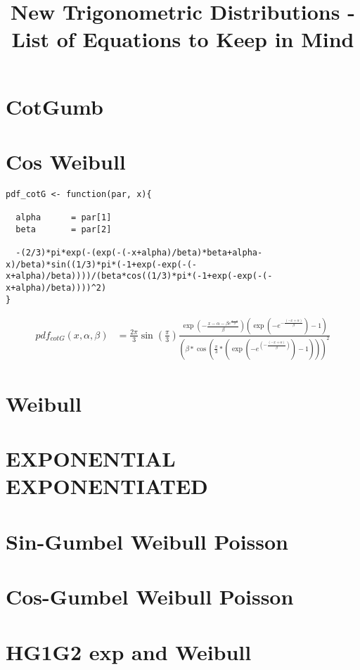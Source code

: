 \documentclass{article}
\begin{document}


\title{New Trigonometric Distributions - List of Equations to Keep in Mind}

\section{CotGumb}

\section{Cos Weibull}

\begin{verbatim}
pdf_cotG <- function(par, x){

  alpha      = par[1]
  beta       = par[2]
  
  -(2/3)*pi*exp(-(exp(-(-x+alpha)/beta)*beta+alpha-x)/beta)*sin((1/3)*pi*(-1+exp(-exp(-(-x+alpha)/beta))))/(beta*cos((1/3)*pi*(-1+exp(-exp(-(-x+alpha)/beta))))^2)
}
\end{verbatim}
\begin{align}
  pdf_{cotG}(x, \alpha, \beta) &= \frac{2\pi}{3}\sin\left(\frac{\pi}{3}\right)\frac{\exp\left(-\frac{x-\alpha-\beta e^{\frac{x-\alpha}{\beta}}}{\beta}\right)\left(\exp\left(-e^{-\frac{(-x+\alpha)}{\beta}}\right)-1\right)}{\left(\beta*\cos\left(\frac{\pi}{3}*(\exp(-e^{\left(-\frac{(-x+\alpha)}{\beta}\right)})-1)\right)\right)^2}
\end{align}

\section{Weibull}

\section{EXPONENTIAL EXPONENTIATED}

\section{Sin-Gumbel Weibull Poisson}

\section{Cos-Gumbel Weibull Poisson}

\section{HG1G2 exp and Weibull}
\end{document}
